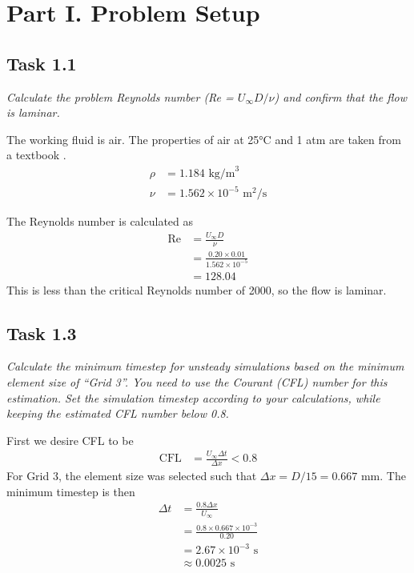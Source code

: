 \section{Part I. Problem Setup}
\subsection{Task 1.1}
\textit{Calculate the problem Reynolds number (Re = $U_\infty D/\nu$) and confirm that the flow is laminar.}

The working fluid is air. The properties of air at 25°C and 1 atm are taken from a textbook \cite{Cengel2017-jf}.
\begin{align*}
    \rho &= 1.184 \text{ kg/m}^3 \\
    \nu &= 1.562 \times 10^{-5} \text{ m}^2/\text{s}
\end{align*}

The Reynolds number is calculated as
\begin{align*}
    \text{Re} &= \frac{U_\infty D}{\nu} \\
    &= \frac{0.20  \times 0.01}{1.562 \times 10^{-5}} \\
    &= \boxed{128.04}
\end{align*}
This is less than the critical Reynolds number of 2000, so the flow is laminar.

\subsection{Task 1.3}
\textit{Calculate the minimum timestep for unsteady simulations based on the minimum element size of “Grid 3”. You need to use the Courant (CFL) number for this estimation. Set the simulation timestep according to your calculations, while keeping the estimated CFL number below 0.8.}

First we desire CFL to be 
\begin{align*}
    \text{CFL} &= \frac{U_\infty \Delta t}{\Delta x} < 0.8
\end{align*}
For Grid 3, the element size was selected such that $\Delta x = D/15 = 0.667$ mm. The minimum timestep is then
\begin{align*}
    \Delta t &= \frac{0.8 \Delta x}{U_\infty} \\
    &= \frac{0.8 \times 0.667 \times 10^{-3}}{0.20} \\
    &= 2.67 \times 10^{-3} \text{ s} \\
    &\approx \boxed{0.0025} \text{ s}
\end{align*}

